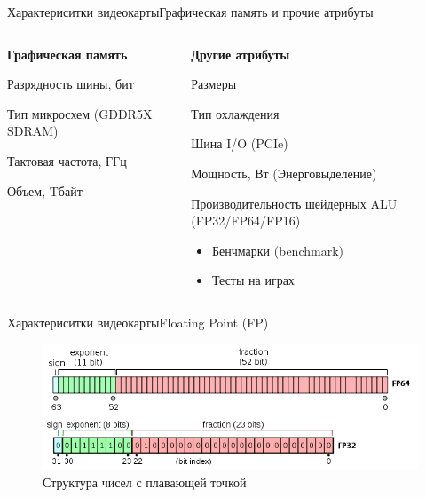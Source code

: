 \documentclass{beamer}
\begin{document}
\begin{frame}{Характериситки видеокарты}{Графическая память и прочие атрибуты}
	\begin{columns}
		\begin{column}{0.5\textwidth}
			\textbf{Графическая память}
			
			Разрядность шины, бит
			
			Тип микросхем (GDDR5X SDRAM)
			
			Тактовая частота, ГГц
			
			Объем, Tбайт
		\end{column}
		\begin{column}{0.5\textwidth}
			\textbf{Другие атрибуты}
			
			Размеры
			
			Тип охлаждения
			
			Шина I/O (PCIe)
			
			Мощность, Вт (Энерговыделение)
			
			Производительность шейдерных  ALU (FP32/FP64/FP16)
			\begin{itemize}
				\item 
				Бенчмарки (benchmark)
				\item 
				Тесты на играх
			\end{itemize}
			
		\end{column}
	\end{columns}
\end{frame}


\begin{frame}{Характериситки видеокарты}{Floating Point (FP)}
	\begin{figure} 
		\includegraphics[width=\textwidth]{images/Floating_Point_structure.png}
		\caption {Структура чисел с плавающей точкой}
	\end{figure}
	
\end{frame}
\end{document}
